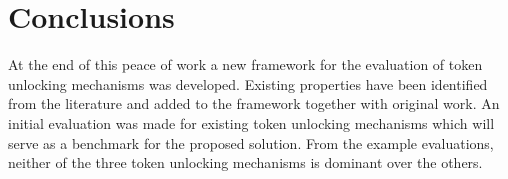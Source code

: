 \section{Conclusions}
At the end of this peace of work a new framework for the evaluation of token unlocking mechanisms was developed. Existing properties have been identified from the literature and added to the framework together with original work. An initial evaluation was made for existing token unlocking mechanisms which will serve as a benchmark for the proposed solution. From the example evaluations, neither of the three token unlocking mechanisms is dominant over the others.

